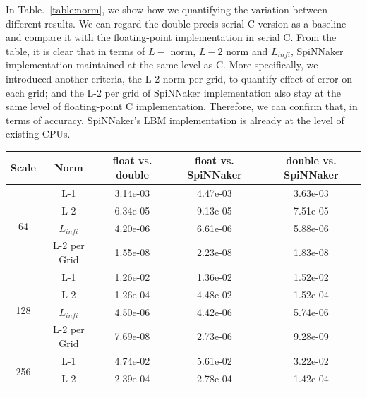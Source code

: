 In Table.~\ref{table:norm}, we show how we quantifying the variation between different results. We can regard the double precis serial C version as a baseline and compare it with the floating-point implementation in serial C. From the table, it is clear that in terms of $L-$ norm, $L-2$ norm and $L_{infi}$, SpiNNaker implementation maintained at the same level as C. More specifically, we introduced another criteria, the L-2 norm per grid, to quantify effect of error on each grid; and the L-2 per grid of SpiNNaker implementation also stay at the same level of floating-point C implementation. Therefore, we can confirm that, in terms of accuracy, SpiNNaker's LBM implementation is already at the level of existing CPUs.\\

\begin{table}[tb]
\begin{tabular}{|c|c|c|c|c|}
\hline
Scale                & Norm        & float vs. double& float vs. SpiNNaker& double vs. SpiNNaker\\ \hline
\multirow{4}{*}{64}  & L-1          & 3.14e-03             & 4.47e-03              & 3.63e-03               \\ \cline{2-5} 
                     & L-2          & 6.34e-05           & 9.13e-05          & 7.51e-05           \\ \cline{2-5} 
                     & $L_{infi}$  & 4.20e-06           & 6.61e-06          & 5.88e-06           \\ \cline{2-5} 
                     & L-2 per Grid & 1.55e-08          & 2.23e-08           & 1.83e-08            \\ \hline
\multirow{4}{*}{128} & L-1          & 1.26e-02             & 1.36e-02              & 1.52e-02               \\ \cline{2-5} 
                     & L-2          & 1.26e-04             & 4.48e-02              & 1.52e-04               \\ \cline{2-5} 
                     & $L_{infi}$  & 4.50e-06          & 4.42e-06          & 5.74e-06           \\ \cline{2-5} 
                     & L-2 per Grid & 7.69e-08          & 2.73e-06           & 9.28e-09            \\ \hline
\multirow{4}{*}{256} & L-1          & 4.74e-02             & 5.61e-02              & 3.22e-02               \\ \cline{2-5} 
                     & L-2          & 2.39e-04             & 2.78e-04              & 1.42e-04               \\ \cline{2-5} 

\end{tabular}
\end{table}
